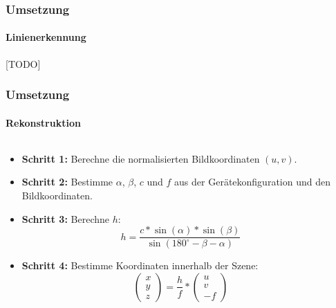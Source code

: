 \documentclass[xcolor=dvipsnames]{beamer}
\begin{document}
\begin{frame}
	\frametitle{Umsetzung}
	\framesubtitle{Linienerkennung}

	[TODO]

\end{frame}


\begin{frame}
	\frametitle{Umsetzung}
	\framesubtitle{Rekonstruktion}

	\begin{columns}
		\small
		\begin{column}{.65\linewidth}
			\begin{itemize}
				\item \textbf{Schritt 1:} Berechne die normalisierten Bildkoordinaten $(u,v)$.
				\item \textbf{Schritt 2:} Bestimme $\alpha$, $\beta$, $c$ und $f$ aus der Gerätekonfiguration und den Bildkoordinaten.
				\item \textbf{Schritt 3:} Berechne $h$:
				\[h = \frac{c * \sin(\alpha) * \sin(\beta)}{\sin(180^\circ - \beta - \alpha)}\]
				\item \textbf{Schritt 4:} Bestimme Koordinaten innerhalb der Szene:
				\[\begin{pmatrix}x\\y\\z\end{pmatrix} = \frac{h}{f} *
				\begin{pmatrix}u\\v\\-f\end{pmatrix}\]
			\end{itemize}
		\end{column}
		\begin{column}{.35\linewidth}
			\hfill{}

\end{column}
\end{columns}
\end{frame}
\end{document}
